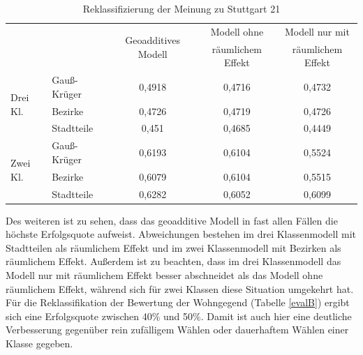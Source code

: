 \documentclass{Vorlage}
\begin{document}
\begin{table}[h]
\centering
\caption{Reklassifizierung der Meinung zu Stuttgart 21}
\label{evalS21}
\begin{tabular}{ll|c|c|c}
\hline \hline
                          &              & \multirow{2}{*}{Geoadditives Modell} & Modell ohne       & Modell nur mit    \\
                          &              &                                      & räumlichem Effekt & räumlichem Effekt \\ \hline
\multirow{3}{*}{Drei Kl.} & Gauß-Krüger & 0,4918                               & 0,4716            & 0,4732            \\
                          & Bezirke      & 0,4726                               & 0,4719            & 0,4726            \\
                          & Stadtteile   & 0,451                                & 0,4685            & 0,4449            \\ \hline
\multirow{3}{*}{Zwei Kl.} & Gauß-Krüger & 0,6193                               & 0,6104            & 0,5524            \\
                          & Bezirke      & 0,6079                               & 0,6104            & 0,5515            \\
                          & Stadtteile   & 0,6282                               & 0,6052            & 0,6099            \\ \hline \hline
\end{tabular}
\end{table}

Des weiteren ist zu sehen, dass das geoadditive Modell in fast allen Fällen die höchste Erfolgsquote aufweist. Abweichungen bestehen im drei Klassenmodell mit Stadtteilen als räumlichem Effekt und im zwei Klassenmodell mit Bezirken als räumlichem Effekt. Außerdem ist zu beachten, dass im drei Klassenmodell das Modell nur mit räumlichem Effekt besser abschneidet als das Modell ohne räumlichem Effekt, während sich für zwei Klassen diese Situation umgekehrt hat.\\
Für die Reklassifikation der Bewertung der Wohngegend (Tabelle \ref{evalB}) ergibt sich eine Erfolgsquote zwischen 40\% und 50\%. Damit ist auch hier eine deutliche Verbesserung gegenüber rein zufälligem Wählen oder dauerhaftem Wählen einer Klasse gegeben. 
\end{document}
